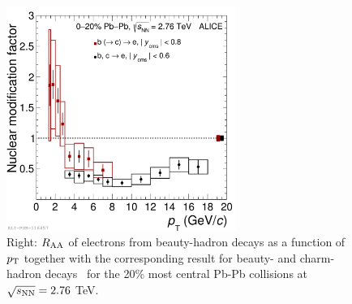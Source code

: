 \begin{figure}[!ht]
  \centering
    \includegraphics[width=7.5cm]{FigCap2/2017-Jan-28-rParAAbeautyincl.pdf}
  \caption{Right: $R_{\rm AA}$ of electrons from beauty-hadron decays as a function of $p_{\rm T}$ together with
the corresponding result for beauty- and charm-hadron decays~\cite{Adam:2016khe} for the 20\% most central Pb-Pb collisions at $\sqrt{s_{\rm NN}}=2.76$ TeV.}
  \label{fig:ColorMassDep}
\end{figure}


